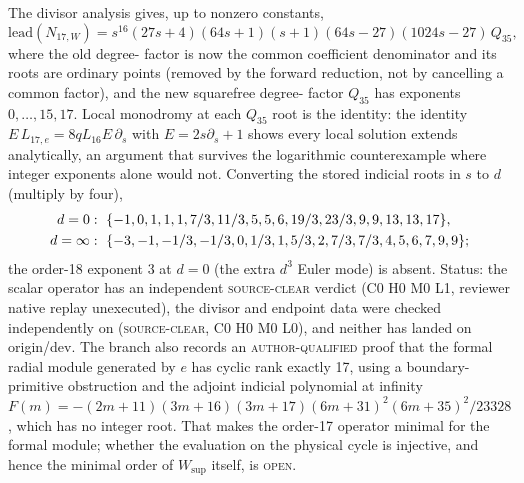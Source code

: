 \documentclass[aps,prd,onecolumn,amsmath,amssymb,longbibliography,floatfix,nofootinbib]{revtex4-2}
\newcommand{\Wsup}{W_{\mathrm{sup}}}
\newcommand{\st}[1]{\textsc{#1}}
\begin{document}
The divisor analysis gives, up to nonzero constants,
\begin{equation}
\mathrm{lead}(N_{17,W})=s^{16}(27s+4)(64s+1)(s+1)(64s-27)(1024s-27)\,Q_{35},
\end{equation}
where the old degree-\OldFactorDegVal{} factor is now the common coefficient denominator and its roots are ordinary points (removed by the forward reduction, not by cancelling a common factor), and the new squarefree degree-\NewFactorDegVal{} factor $Q_{35}$ has exponents $0,\dots,15,17$. Local monodromy at each $Q_{35}$ root is the identity: the identity $E\,L_{17,e}=8qL_{16}E\,\partial_s$ with $E=2s\partial_s+1$ shows every local solution extends analytically, an argument that survives the logarithmic counterexample where integer exponents alone would not. Converting the stored indicial roots in $s$ to $d$ (multiply by four),
\begin{align}
d=0&:\ \{-1,0,1,1,1,7/3,11/3,5,5,6,19/3,23/3,9,9,13,13,17\},\nonumber\\
d=\infty&:\ \{-3,-1,-1/3,-1/3,0,1/3,1,5/3,2,7/3,7/3,4,5,6,7,9,9\} ;
\end{align}
the order-18 exponent $3$ at $d=0$ (the extra $d^3$ Euler mode) is absent. Status: the scalar operator has an independent \st{source-clear} verdict (C0 H0 M0 L1, reviewer native replay unexecuted), the divisor and endpoint data were checked independently on \RefCTwoSeven{} (\st{source-clear}, C0 H0 M0 L0), and neither has landed on origin/dev. The branch also records an \st{author-qualified} proof that the formal radial module generated by $e$ has cyclic rank exactly 17, using a boundary-primitive obstruction and the adjoint indicial polynomial at infinity $F(m)=-(2m+11)(3m+16)(3m+17)(6m+31)^2(6m+35)^2/23328$, which has no integer root. That makes the order-17 operator minimal for the formal module; whether the evaluation on the physical cycle is injective, and hence the minimal order of $\Wsup$ itself, is \st{open}.
\end{document}
